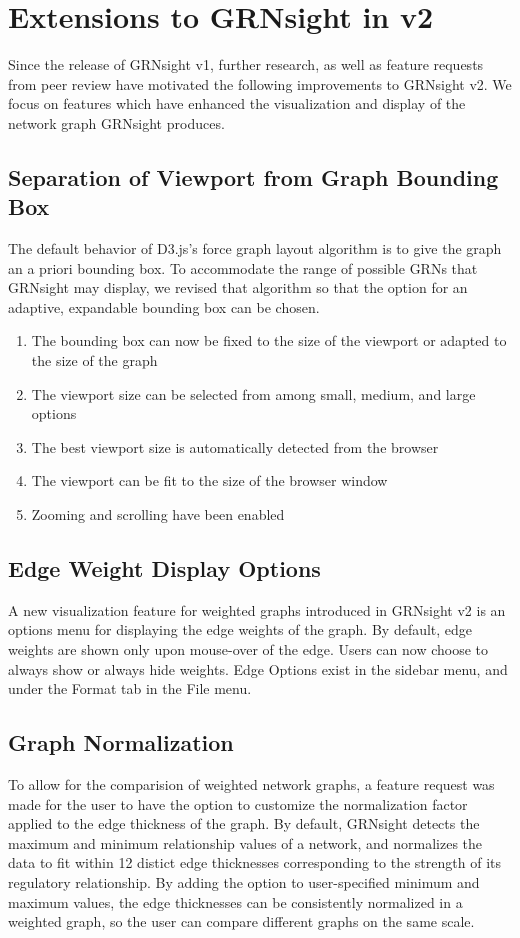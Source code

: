 \documentclass[sigconf,review]{acmart}
\begin{document}
\section{Extensions to GRNsight in v2}
Since the release of GRNsight v1, further research, as well as feature requests from peer review have motivated the following improvements to GRNsight v2. We focus on features which have enhanced the visualization and display of the network graph GRNsight produces.

\subsection{Separation of Viewport from Graph Bounding Box}

The default behavior of D3.js's force graph layout algorithm is to give the graph an a priori bounding box. To accommodate the range of possible GRNs that GRNsight may display, we revised that algorithm so that the option for an adaptive, expandable bounding box can be chosen.

\begin{enumerate}
  \item The bounding box can now be fixed to the size of the viewport or adapted to the size of the graph
  \item The viewport size can be selected from among small, medium, and large options
  \item The best viewport size is automatically detected from the browser
  \item The viewport can be fit to the size of the browser window 
  \item Zooming and scrolling have been enabled
\end{enumerate}


\subsection{Edge Weight Display Options}
A new visualization feature for weighted graphs introduced in GRNsight v2 is an options menu for displaying the edge weights of the graph. By default, edge weights are shown only upon mouse-over of the edge. Users can now choose to always show or always hide weights. Edge Options exist in the sidebar menu, and under the Format tab in the File menu.

\subsection{Graph Normalization}
To allow for the comparision of weighted network graphs, a feature request was made for the user to have the option to customize the normalization factor applied to the edge thickness of the graph. By default, GRNsight detects the maximum and minimum relationship values of a network, and normalizes the data to fit within 12 distict edge thicknesses corresponding to the strength of its regulatory relationship. By adding the option to user-specified minimum and maximum values, the edge thicknesses can be consistently normalized in a weighted graph, so the user can compare different graphs on the same scale. 
\end{document}
